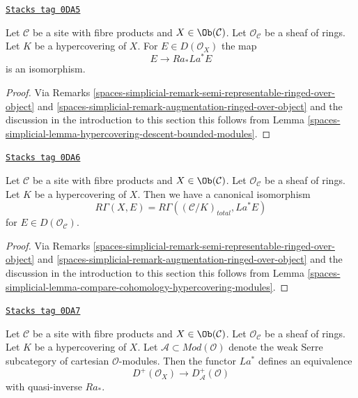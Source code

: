 \begin{lemma}
\label{spaces-simplicial-lemma-hypercovering-X-descent-bounded-modules}
\href{https://stacks.math.columbia.edu/tag/0DA5}{\texttt{Stacks tag 0DA5}}

Let $\mathcal{C}$ be a site with fibre products and $X \in \Ob(\mathcal{C})$.
Let $\mathcal{O}_\mathcal{C}$ be a sheaf of rings.
Let $K$ be a hypercovering of $X$. For
$E \in D(\mathcal{O}_X)$ the map
$$
E \longrightarrow Ra_*La^*E
$$
is an isomorphism.
\end{lemma}

\begin{proof}
Via Remarks \ref{spaces-simplicial-remark-semi-representable-ringed-over-object} and
\ref{spaces-simplicial-remark-augmentation-ringed-over-object} and the discussion in
the introduction to this section
this follows from Lemma \ref{spaces-simplicial-lemma-hypercovering-descent-bounded-modules}.
\end{proof}

\begin{lemma}
\label{spaces-simplicial-lemma-compare-cohomology-hypercovering-X-modules}
\href{https://stacks.math.columbia.edu/tag/0DA6}{\texttt{Stacks tag 0DA6}}

Let $\mathcal{C}$ be a site with fibre products and $X \in \Ob(\mathcal{C})$.
Let $\mathcal{O}_\mathcal{C}$ be a sheaf of rings.
Let $K$ be a hypercovering of $X$.
Then we have a canonical isomorphism
$$
R\Gamma(X, E) = R\Gamma((\mathcal{C}/K)_{total}, La^*E)
$$
for $E \in D(\mathcal{O}_\mathcal{C})$.
\end{lemma}

\begin{proof}
Via Remarks \ref{spaces-simplicial-remark-semi-representable-ringed-over-object} and
\ref{spaces-simplicial-remark-augmentation-ringed-over-object} and the discussion in
the introduction to this section
this follows from Lemma \ref{spaces-simplicial-lemma-compare-cohomology-hypercovering-modules}.
\end{proof}

\begin{lemma}
\label{spaces-simplicial-lemma-hypercovering-X-equivalence-bounded-modules}
\href{https://stacks.math.columbia.edu/tag/0DA7}{\texttt{Stacks tag 0DA7}}

Let $\mathcal{C}$ be a site with fibre products and $X \in \Ob(\mathcal{C})$.
Let $\mathcal{O}_\mathcal{C}$ be a sheaf of rings.
Let $K$ be a hypercovering of $X$.
Let $\mathcal{A} \subset \textit{Mod}(\mathcal{O})$
denote the weak Serre subcategory of cartesian $\mathcal{O}$-modules.
Then the functor $La^*$ defines an equivalence
$$
D^+(\mathcal{O}_X) \longrightarrow D_\mathcal{A}^+(\mathcal{O})
$$
with quasi-inverse $Ra_*$.
\end{lemma}

